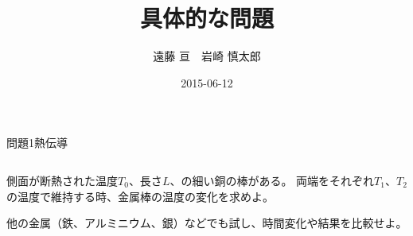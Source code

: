 \documentclass[dvipdfmx]{beamer}
\title[2015年度初年次ゼミ問題]{具体的な問題}
\subtitle{}
\author[遠藤 亘　岩崎 慎太郎]{遠藤 亘　岩崎 慎太郎}
\institute[田浦研]{情報理工学系研究科 修士1年 田浦研究室}
\date{2015-06-12}
\newenvironment{wideitemize}{\itemize\setlength{\itemsep}{1em}}{\enditemize}
\newenvironment{wideitemize2}{\itemize\setlength{\itemsep}{0.2em}}{\enditemize}
\begin{document}
\begin{frame}
\titlepage
\end{frame}



\begin{frame}{問題1}{熱伝導}
\begin{columns}[t]
\begin{column}{0.7\textwidth}
\begin{wideitemize}
	\item 側面が断熱された温度$T_0$、長さ$L$、の細い銅の棒がある。
	両端をそれぞれ$T_1$、$T_2$の温度で維持する時、金属棒の温度の変化を求めよ。
	\begin{wideitemize2}
		\item 他の金属（鉄、アルミニウム、銀）などでも試し、時間変化や結果を比較せよ。
	\end{wideitemize2}

\end{wideitemize}


\end{column}
\end{columns}
\end{frame}
\end{document}
